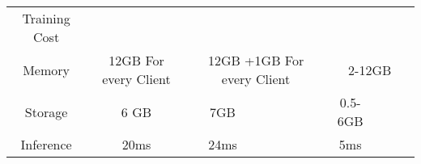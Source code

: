 \begin{table}[]
{\begin{tabular}{|c|c|cccc|cccc|}
\multirow{2}{*}{Training Cost}                                                & \multirow{2}{*}{}                            & \multicolumn{4}{c|}{\multirow{2}{*}{}}                                                                            & \multicolumn{4}{c|}{\multirow{2}{*}{}}                                                                            \\
                                                                              &                                              & \multicolumn{4}{c|}{}                                                                                             & \multicolumn{4}{c|}{}                                                                                             \\ \hline
\multirow{2}{*}{Memory}                                                       & \multirow{2}{*}{12GB For every Client}       & \multicolumn{4}{c|}{\multirow{2}{*}{12GB +1GB For every Client}}                                                  & \multicolumn{4}{c|}{\multirow{2}{*}{2-12GB}}                                                                      \\
                                                                              &                                              & \multicolumn{4}{c|}{}                                                                                             & \multicolumn{4}{c|}{}                                                                                             \\ \hline
\multirow{2}{*}{Storage}                                                      & \multirow{2}{*}{6 GB}                        & \multirow{2}{*}{7GB}       & \multirow{2}{*}{}          & \multirow{2}{*}{}          & \multirow{2}{*}{}          & \multirow{2}{*}{0.5-6GB}   & \multirow{2}{*}{}          & \multirow{2}{*}{}          & \multirow{2}{*}{}          \\
                                                                              &                                              &                            &                            &                            &                            &                            &                            &                            &                            \\ \hline
\multirow{2}{*}{Inference}                                                    & \multirow{2}{*}{20ms}                        & \multirow{2}{*}{24ms}      & \multirow{2}{*}{}          & \multirow{2}{*}{}          & \multirow{2}{*}{}          & \multirow{2}{*}{5ms}       & \multirow{2}{*}{}          & \multirow{2}{*}{}          & \multirow{2}{*}{}          \\

\end{tabular}}
\end{table}
